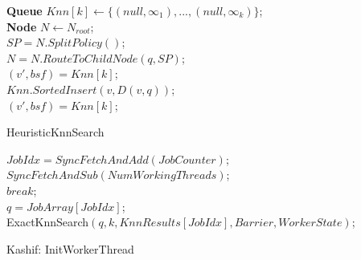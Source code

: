 

\begin{algorithm}
	\DontPrintSemicolon
	\vspace{.2cm}
	\textbf{Queue} $Knn[k] \gets \{(null, \infty_{1}), ..., (null, \infty_{k})\}$;\\
	\textbf{Node} $N \gets N_{root}$;\\
	{
		$SP = N.SplitPolicy()$;\\
		$N = N.RouteToChildNode(q, SP)$;\\
		
	}
	\vspace{.1cm}
	$(v', bsf) = Knn[k]$;\\
	{
		{
			$Knn.SortedInsert(v, D(v, q))$;\\
		}
		$(v', bsf) = Knn[k]$;\\
	}


	\caption{{\sc HeuristicKnnSearch}}
	\label{algo:heuristic_knn_search}
\end{algorithm}



\small
\begin{algorithm}
	\DontPrintSemicolon %
	\vspace{.2cm}
	
	{
		$JobIdx = SyncFetchAndAdd(JobCounter)$;\\
		{
			$SyncFetchAndSub(NumWorkingThreads)$;\\
			$break$; \\
		}
		$q = JobArray[JobIdx]$;\\
	 	{\sc ExactKnnSearch$(q, k, KnnResults[JobIdx], Barrier, WorkerState)$};
	 	
	}
	
	\caption{{\sc Kashif: InitWorkerThread}}
	\label{algo:init_thread}
\end{algorithm}


